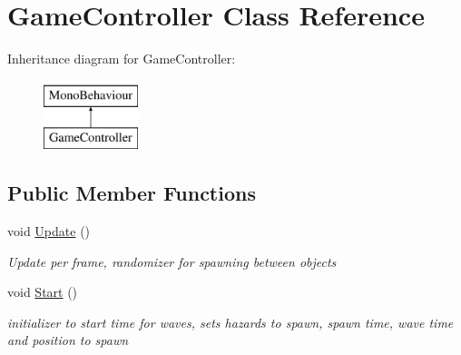 \hypertarget{classGameController}{\section{Game\-Controller Class Reference}
\label{classGameController}
}
Inheritance diagram for Game\-Controller\-:\begin{figure}[H]
\begin{center}
\leavevmode
\includegraphics[height=2.000000cm]{classGameController}
\end{center}
\end{figure}
\subsection*{Public Member Functions}
\begin{DoxyCompactItemize}
\item 
void \hyperlink{classGameController_a5a89277529cadb49af7d55eba3bbf056}{Update} ()
\begin{DoxyCompactList}\small\item\em Update per frame, randomizer for spawning between objects \end{DoxyCompactList}\item 
void \hyperlink{classGameController_a97788a7aa0f09c8d748781683e5f045b}{Start} ()
\begin{DoxyCompactList}\small\item\em initializer to start time for waves, sets hazards to spawn, spawn time, wave time and position to spawn \end{DoxyCompactList}\end{DoxyCompactItemize}
